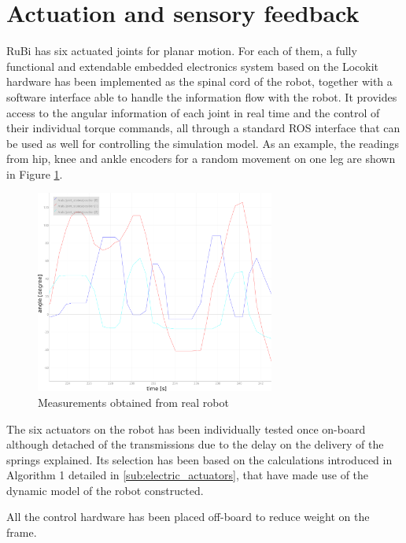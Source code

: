 
\section{Actuation and sensory feedback} %
\label{sec:actuation_and_sensory_feedback}
RuBi has six actuated joints for planar motion.
For each of them, a fully functional and extendable embedded electronics system based on the Locokit hardware has been implemented as the spinal cord of the robot, together with a software interface able to handle the information flow with the robot.
It provides access to the angular information of each joint in real time and the control of their individual torque commands, all through a standard ROS interface that can be used as well for controlling the simulation model.
As an example, the readings from hip, knee and ankle encoders for a random movement on one leg are shown in Figure \ref{fig:position_measurements}.


\begin{figure}[h]
  \centering
  \includegraphics[width=0.7\textwidth]{figures/position_measurements.pdf}
  \caption{Measurements obtained from real robot}
  \label{fig:position_measurements}
\end{figure}


The six actuators on the robot has been individually tested once on-board although detached of the transmissions due to the delay on the delivery of the springs explained.
Its selection has been based on the calculations introduced in Algorithm 1 detailed in \ref{sub:electric_actuators}, that have made use of the dynamic model of the robot constructed.

All the control hardware has been placed off-board to reduce weight on the frame.

